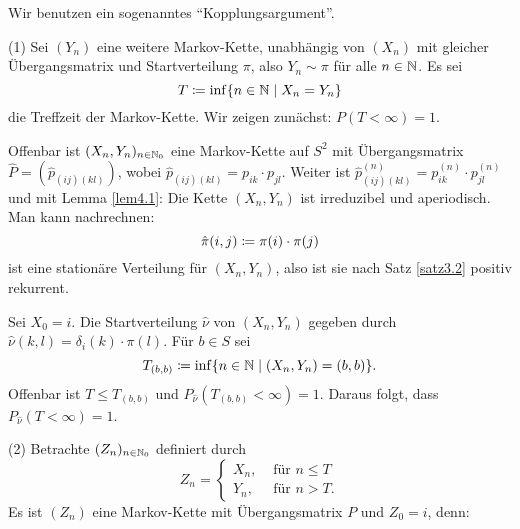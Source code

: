 \documentclass[a4paper,twoside,DIV15,BCOR12mm]{scrbook}
\begin{document}
\begin{beweis}
Wir benutzen ein sogenanntes ``Kopplungsargument''.

(1) Sei $(Y_n)$ eine weitere Markov-Kette, unabhängig von $(X_n)$ mit gleicher Übergangsmatrix und Startverteilung $\pi$, also $Y_n\sim \pi$ für alle $n\in \mathbb{N}$. Es sei
\[
T\da \inf\{n\in \MdN \mid X_n = Y_n\}
\]
die Treffzeit der Markov-Kette. Wir zeigen zunächst: $P(T<\infty) = 1$.

Offenbar ist $(X_n,Y_n)_{n\in\mathbb{N}_0}$ eine Markov-Kette auf $S^2$ mit Übergangsmatrix $\hat P=(\hat p_{(ij)(kl)})$, wobei $\hat p_{(ij)(kl)} = p_{ik}\cdot p_{jl}$. Weiter ist $\hat p_{(ij)(kl)}^{(n)} = p_{ik}^{(n)} \cdot p_{jl}^{(n)}$ und mit Lemma \ref{lem4.1}: Die Kette $(X_n,Y_n)$ ist irreduzibel und aperiodisch. Man kann nachrechnen:
\[
\hat \pi (i,j) \da \pi(i)\cdot\pi(j)
\]
ist eine stationäre Verteilung für $(X_n,Y_n)$, also ist sie nach Satz \ref{satz3.2} positiv rekurrent.

Sei $X_0=i$. Die Startverteilung $\hat \nu$ von $(X_n,Y_n)$ gegeben durch $\hat \nu (k,l) = \delta_i(k) \cdot\pi(l)$. Für $b\in S$ sei 
\[
T_{(b,b)} \da \inf\{n\in\MdN \mid (X_n,Y_n) = (b,b) \}.
\]
Offenbar ist $T\le T_{(b,b)}$ und $P_{\hat \nu}(T_{(b,b)}<\infty)=1$. Daraus folgt, dass $P_{\hat \nu}(T<\infty)=1$.


(2) Betrachte $(Z_n)_{n\in\mathbb{N}_0}$ definiert durch
\[
Z_n= 
\begin{cases}
X_n, &\text{ für } n\le T \\
Y_n, &\text{ für } n>T.
\end{cases}
\]
Es ist $(Z_n)$ eine Markov-Kette mit Übergangsmatrix $P$ und $Z_0=i$, denn:


\end{beweis}
\end{document}
